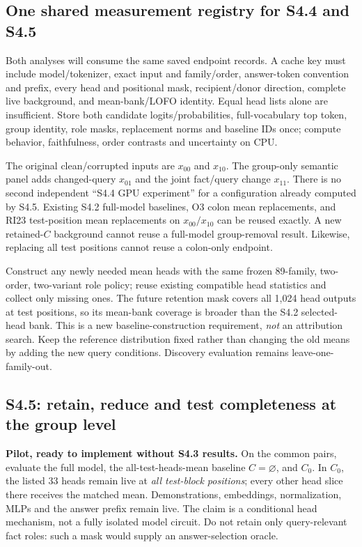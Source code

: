 \subsection{One shared measurement registry for S4.4 and S4.5}
Both analyses will consume the same saved endpoint records. A cache key must include model/tokenizer, exact input and family/order, answer-token convention and prefix, every head and positional mask, recipient/donor direction, complete live background, and mean-bank/LOFO identity. Equal head lists alone are insufficient. Store both candidate logits/probabilities, full-vocabulary top token, group identity, role masks, replacement norms and baseline IDs once; compute behavior, faithfulness, order contrasts and uncertainty on CPU.

The original clean/corrupted inputs are $x_{00}$ and $x_{10}$. The group-only semantic panel adds changed-query $x_{01}$ and the joint fact/query change $x_{11}$. There is no second independent ``S4.4 GPU experiment'' for a configuration already computed by S4.5. Existing S4.2 full-model baselines, O3 colon mean replacements, and RI23 test-position mean replacements on $x_{00}/x_{10}$ can be reused exactly. A new retained-$C$ background cannot reuse a full-model group-removal result. Likewise, replacing all test positions cannot reuse a colon-only endpoint.

Construct any newly needed mean heads with the same frozen 89-family, two-order, two-variant role policy; reuse existing compatible head statistics and collect only missing ones. The future retention mask covers all 1,024 head outputs at test positions, so its mean-bank coverage is broader than the S4.2 selected-head bank. This is a new baseline-construction requirement, \emph{not} an attribution search. Keep the reference distribution fixed rather than changing the old means by adding the new query conditions. Discovery evaluation remains leave-one-family-out.

\subsection{S4.5: retain, reduce and test completeness at the group level}
\textbf{Pilot, ready to implement without S4.3 results.} On the common pairs, evaluate the full model, the all-test-heads-mean baseline $C=\varnothing$, and $C_0$. In $C_0$, the listed 33 heads remain live at \emph{all test-block positions}; every other head slice there receives the matched mean. Demonstrations, embeddings, normalization, MLPs and the answer prefix remain live. The claim is a conditional head mechanism, not a fully isolated model circuit. Do not retain only query-relevant fact roles: such a mask would supply an answer-selection oracle.

